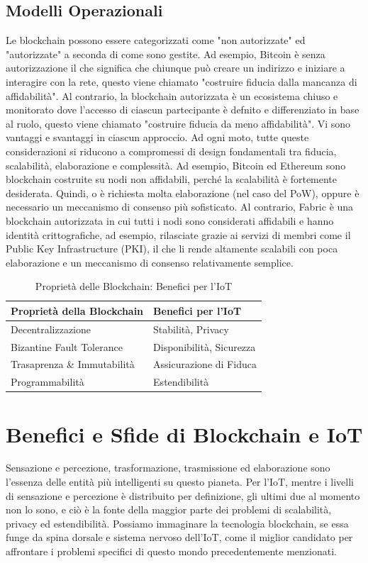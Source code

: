 \documentclass[a4paper,12pt]{article}
\begin{document}
\subsection{Modelli Operazionali}
Le blockchain possono essere categorizzati come "non autorizzate" ed "autorizzate" a seconda di come sono gestite. Ad esempio, Bitcoin è senza autorizzazione il che significa che chiunque può creare un indirizzo e iniziare a interagire con la rete, questo viene chiamato "costruire fiducia dalla mancanza di affidabilità". Al contrario, la blockchain autorizzata è un ecosistema chiuso e monitorato dove l'accesso di ciascun partecipante è defnito e differenziato in base al ruolo, questo viene chiamato "costruire fiducia da meno affidabilità".
Vi sono vantaggi e svantaggi in ciascun approccio. Ad ogni moto, tutte queste considerazioni si riducono a compromessi di design fondamentali tra fiducia, scalabilità, elaborazione e complessità. Ad esempio, Bitcoin ed Ethereum sono blockchain costruite su nodi non affidabili, perché la scalabilità è fortemente desiderata. Quindi, o è richiesta molta elaborazione (nel caso del PoW), oppure è necessario un meccanismo di consenso più sofisticato. Al contrario, Fabric \cite{14} è una blockchain autorizzata in cui tutti i nodi sono considerati affidabili e hanno identità crittografiche, ad esempio, rilasciate grazie ai servizi di membri come il Public Key Infrastructure (PKI), il che li rende altamente scalabili con poca elaborazione e un meccanismo di consenso relativamente semplice.

\begin{table}[tp]%
	\caption{Proprietà delle Blockchain: Benefici per l'IoT}
	\label{table:BlockchainBenefits}\centering %
	\begin{tabular}{l|l}
		\hline
		Proprietà della Blockchain  & Benefici per l'IoT       \\
		\hline
		Decentralizzazione          & Stabilità, Privacy       \\
		Bizantine Fault Tolerance   & Disponibilità, Sicurezza \\
		Trasaprenza \& Immutabilità & Assicurazione di Fiduca  \\
		Programmabilità             & Estendibilità            \\
		\hline
	\end{tabular}
\end{table}

\section{Benefici e Sfide di Blockchain e IoT}
Sensazione e percezione, trasformazione, trasmissione ed elaborazione sono l'essenza delle entità più intelligenti su questo pianeta. Per l'IoT, mentre i livelli di sensazione e percezione è distribuito per definizione, gli ultimi due al momento non lo sono, e ciò è la fonte della maggior parte dei problemi di scalabilità, privacy ed estendibilità. Possiamo immaginare la tecnologia blockchain, se essa funge da spina dorsale e sistema nervoso dell'IoT, come il miglior candidato per affrontare i problemi specifici di questo mondo precedentemente menzionati.
\end{document}
